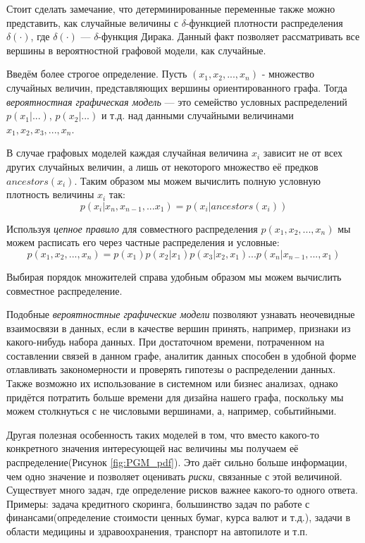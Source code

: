 Стоит сделать замечание, что детерминированные переменные также можно представить,
 как случайные величины с $\delta$-функцией плотности распределения $\delta(\cdot)$,
 где $\delta(\cdot)$ --- $\delta$-функция Дирака. Данный факт позволяет рассматривать все вершины
 в вероятностной графовой модели, как случайные.

Введём более строгое определение. Пусть $(x_1, x_2, ..., x_n)$ - множество случайных величин, представляющих вершины
 ориентированного графа. Тогда \textit{вероятностная графическая модель} --- это семейство условных распределений $p(x_1 | ...)$, $p(x_2 | ...)$ и т.д. над
 данными случайными величинами $x_1, x_2, x_3, ..., x_n$.

В случае графовых моделей каждая случайная величина $x_i$ зависит не от всех других случайных
 величин, а лишь от некоторого множество её предков $ancestors(x_i)$.
 Таким образом мы можем вычислить полную условную плотность величины $x_i$ так:
$$p(x_i | x_n, x_{n-1}, ... x_1) = p(x_i | ancestors(x_i))$$

Используя \textit{цепное правило} для совместного распределения $p(x_1, x_2, ..., x_n)$ мы можем расписать его
 через частные распределения и условные:
$$p(x_1, x_2, ..., x_n) = p(x_1) p(x_2 | x_1) p(x_3 | x_2, x_1) ... p(x_n | x_{n-1}, ..., x_1)$$

Выбирая порядок множителей справа удобным образом мы можем вычислить совместное распределение.

Подобные \textit{вероятностные графические модели} позволяют узнавать неочевидные взаимосвязи в данных, если в качестве
 вершин принять, например, признаки из какого-нибудь набора данных. При достаточном времени, потраченном на составлении связей в данном графе,
 аналитик данных способен в удобной форме отлавливать закономерности и проверять гипотезы о распределении данных. Также возможно их использование в
 системном или бизнес анализах, однако придётся потратить больше времени для дизайна нашего графа, поскольку мы можем столкнуться с не числовыми вершинами, а, например, событийными.

Другая полезная особенность таких моделей в том, что вместо какого-то конкретного значения интересующей нас величины мы получаем её распределение(Рисунок \ref{fig:PGM_pdf}).
 Это даёт сильно больше информации, чем одно значение и позволяет оценивать \textit{риски}, связанные с этой величиной. Существует много задач, где определение рисков важнее
 какого-то одного ответа. Примеры: задача кредитного скоринга, большинство задач по работе с финансами(определение стоимости ценных бумаг, курса валют и т.д.), задачи в области медицины
 и здравоохранения, транспорт на автопилоте и т.п.

